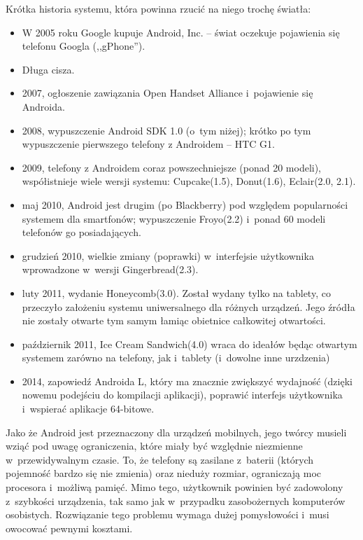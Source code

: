 Krótka historia systemu, która powinna rzucić na niego trochę światła:
\begin{itemize}
	\item W 2005 roku Google kupuje Android, Inc. -- świat oczekuje pojawienia się telefonu Googla (,,gPhone'').
	\item Długa cisza.
	\item 2007, ogłoszenie zawiązania Open Handset Alliance i~pojawienie się Androida.
	\item 2008, wypuszczenie Android SDK 1.0 (o~tym niżej); krótko po tym wypuszczenie pierwszego telefony z Androidem -- HTC G1.
	\item 2009, telefony z Androidem coraz powszechniejsze (ponad 20 modeli), współistnieje wiele wersji systemu: Cupcake(1.5), Donut(1.6), Eclair(2.0, 2.1).
	\item maj 2010, Android jest drugim (po Blackberry) pod względem popularności systemem dla smartfonów; wypuszczenie Froyo(2.2) i~ponad 60 modeli telefonów go posiadających.
	\item grudzień 2010, wielkie zmiany (poprawki) w~interfejsie użytkownika wprowadzone w~wersji Gingerbread(2.3).
	\item luty 2011, wydanie Honeycomb(3.0)\cite{android-history}. Został wydany tylko na tablety, co przeczyło założeniu systemu uniwersalnego dla różnych urządzeń. Jego źródła nie zostały otwarte tym samym łamiąc obietnice całkowitej otwartości.
	\item październik 2011, Ice Cream Sandwich(4.0) wraca do ideałów będąc otwartym systemem zarówno na telefony, jak i~tablety (i~dowolne inne urzdzenia)
	\item 2014, zapowiedź Androida L, który ma znacznie zwiększyć wydajność (dzięki nowemu podejściu do kompilacji aplikacji\cite{android-art}), poprawić interfejs użytkownika i~wspierać aplikacje 64-bitowe\cite{android-l-ogolnie}.
\end{itemize}

Jako że Android jest przeznaczony dla urządzeń mobilnych, jego twórcy musieli wziąć pod uwagę ograniczenia, które miały być względnie niezmienne w~przewidywalnym czasie\cite{learning-android}.
To, że telefony są zasilane z~baterii (których pojemność bardzo się nie zmienia) oraz nieduży rozmiar, ograniczają moc procesora i~możliwą pamięć. Mimo tego, użytkownik powinien być zadowolony z~szybkości urządzenia, tak samo jak w~przypadku zasobożernych komputerów osobistych.
Rozwiązanie tego problemu wymaga dużej pomysłowości i~musi owocować pewnymi kosztami.

